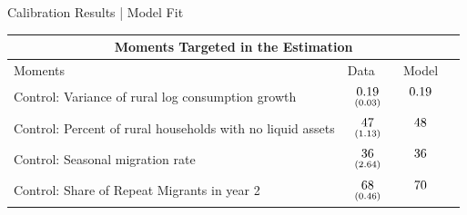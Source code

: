 \documentclass[9pt,pdftex,aspectratio=1610]{beamer}
\theoremstyle{definition}
\begin{document}
\begin{frame}[t]{Calibration Results | Model Fit}
\begin{table}[!t]
\footnotesize
\setlength {\tabcolsep}{2.95mm}
\renewcommand{\arraystretch}{1.}
\begin{center}
\begin{tabular}{l l c c}
\multicolumn{4}{c}{\textbf{\small Moments Targeted in the Estimation}}\\
\hline
\hline
Moments & Data & Model \\
\hline
Control: Variance of rural log consumption growth & $\begin{array}{c}0.19\vspace{-.15cm}\\ \scriptstyle (0.03)\end{array}$
& $\begin{array}{c}0.19\vspace{-.15cm}\\ \scriptstyle \phantom{(0.03)}\end{array}$\\

Control: Percent of rural households with no liquid assets &
$\begin{array}{c}47\vspace{-.15cm}\\ \scriptstyle (1.13)\end{array}$ &
$\begin{array}{c}48\vspace{-.15cm}\\ \scriptstyle \phantom{(1.13)}\end{array}$\\

Control: Seasonal migration rate &
$\begin{array}{c}36\vspace{-.15cm}\\ \scriptstyle (2.64)\end{array}$ &
$\begin{array}{c}36\vspace{-.15cm}\\ \scriptstyle \phantom{(2.64)}\end{array}$ &\\

 Control: Share of Repeat Migrants in year 2 &
$\begin{array}{c}68\vspace{-.15cm}\\ \scriptstyle (0.46)\end{array}$ &
$\begin{array}{c}70\vspace{-.15cm}\\ \scriptstyle \phantom{(0.46)}\end{array}$ & \\


\end{tabular}
\end{center}
\end{table}
\end{frame}
\end{document}
